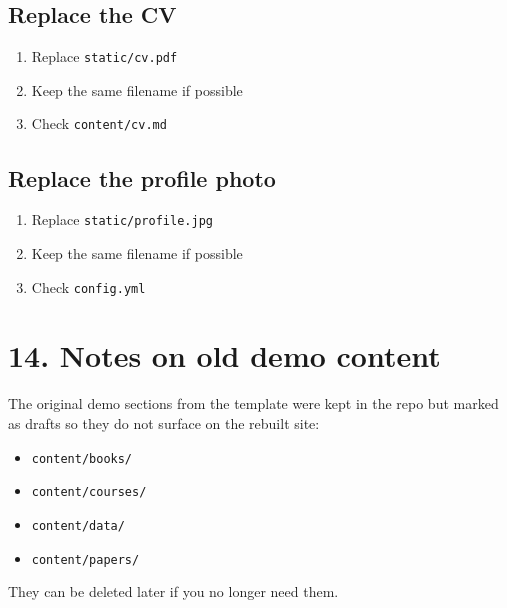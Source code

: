\documentclass[11pt]{article}
\begin{document}
\subsection*{Replace the CV}
\begin{enumerate}
\item Replace \texttt{static/cv.pdf}
\item Keep the same filename if possible
\item Check \texttt{content/cv.md}
\end{enumerate}

\subsection*{Replace the profile photo}
\begin{enumerate}
\item Replace \texttt{static/profile.jpg}
\item Keep the same filename if possible
\item Check \texttt{config.yml}
\end{enumerate}

\section*{14. Notes on old demo content}
The original demo sections from the template were kept in the repo but marked as drafts so they do not surface on the rebuilt site:
\begin{itemize}
\item \texttt{content/books/}
\item \texttt{content/courses/}
\item \texttt{content/data/}
\item \texttt{content/papers/}
\end{itemize}

They can be deleted later if you no longer need them.
\end{document}
